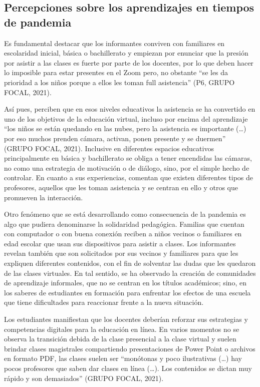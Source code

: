 \documentclass{textolivre}
\begin{document}
\subsection{Percepciones sobre los aprendizajes en tiempos de pandemia}\label{sec-formato}
Es fundamental destacar que los informantes conviven con familiares en escolaridad inicial, básica o bachillerato y empiezan por enunciar que la presión por asistir a las clases es fuerte por parte de los docentes, por lo que deben hacer lo imposible para estar presentes en el Zoom pero, no obstante “se les da prioridad a los niños porque a ellos les toman full asistencia” (P6, GRUPO FOCAL, 2021). 

Así pues, perciben que en esos niveles educativos la asistencia se ha convertido en uno de los objetivos de la educación virtual, incluso por encima del aprendizaje “los niños se están quedando en las nubes, pero la asistencia es importante (…) por eso muchos prenden cámara, activan, ponen presente y se duermen” (GRUPO FOCAL, 2021). Inclusive en diferentes espacios educativos principalmente en básica y bachillerato se obliga a tener encendidas las cámaras, no como una estrategia de motivación o de diálogo, sino, por el simple hecho de controlar. En cuanto a sus experiencias, comentan que existen diferentes tipos de profesores, aquellos que les toman asistencia y se centran en ello y otros que promueven la interacción.

Otro fenómeno que se está desarrollando como consecuencia de la pandemia es algo que pudiera denominarse la solidaridad pedagógica. Familias que cuentan con computador o con buena conexión reciben a niños vecinos o familiares en edad escolar que usan sus dispositivos para asistir a clases. Los informantes revelan también que son solicitados por sus vecinos y familiares para que les expliquen diferentes contenidos, con el fin de solventar las dudas que les quedaron de las clases virtuales. En tal sentido, se ha observado la creación de comunidades de aprendizaje informales, que no se centran en los títulos académicos; sino, en los saberes de estudiantes en formación para enfrentar los efectos de una escuela que tiene dificultades para reaccionar frente a la nueva situación.

Los estudiantes manifiestan que los docentes deberían reforzar sus estrategias y competencias digitales para la educación en línea. En varios momentos no se observa la transición debida de la clase presencial a la clase virtual y suelen brindar clases magistrales compartiendo presentaciones de Power Point o archivos en formato PDF, las clases suelen ser “monótonas y poco ilustrativas (…) hay pocos profesores que saben dar clases en línea (…). Los contenidos se dictan muy rápido y son demasiados” (GRUPO FOCAL, 2021).
\end{document}
